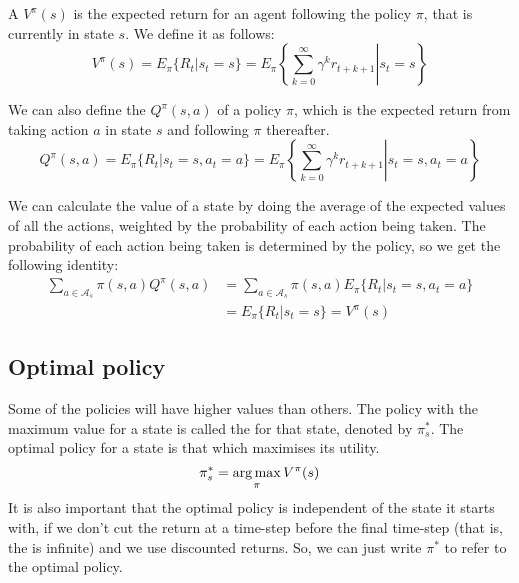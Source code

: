 A  $V^\pi(s)$ is the expected return for an agent following the
policy $\pi$, that is currently in state $s$. We define it as follows:
\begin{equation}
  V^\pi(s) = E_\pi \lbrace R_t | s_t = s \rbrace =
  E_\pi \left\{ \left. \sum_{k=0}^\infty \gamma^kr_{t+k+1} \right| s_t = s \right\}
  \label{eq:definition-value}
\end{equation}

We can also define the  $Q^\pi(s, a)$ of a policy
$\pi$, which is the expected return from taking action $a$ in state $s$ and
following $\pi$ thereafter.
\begin{equation}
  Q^\pi(s, a) = E_\pi \lbrace R_t | s_t = s, a_t = a \rbrace =
  E_\pi \left\{ \left. \sum_{k=0}^\infty \gamma^kr_{t+k+1} \right| s_t = s, a_t = a \right\}
  \label{eq:definition-qvalue}
\end{equation}

\citep[Section~3.7]{sutton1998introduction}

We can calculate the value of a state by doing the average of the
expected values of all the actions, weighted by the probability of each action
being taken. The probability of each action being taken is determined by the
policy, so we get the following identity:
\begin{equation}
  \begin{split}
  \sum_{a\in\mathcal{A}_s}\pi(s, a) Q^\pi(s, a) & = \sum_{a\in\mathcal{A}_s}\pi(s, a) E_\pi \lbrace R_t | s_t = s, a_t = a \rbrace \\
  & = E_\pi \lbrace R_t | s_t = s \rbrace = V^\pi(s)
  \end{split}
  \label{eq:equivalence-qvalue-value}
\end{equation}


\subsection{Optimal policy\label{subsec:optimal-policy}}

Some of the policies will have higher values than others. The policy with the
maximum value for a state is called the  for that state,
denoted by $\pi^*_s$. The optimal policy for a state is that which maximises its utility.
\begin{equation}
\pi^*_s = \argmax_\pi V^\pi(s)
\end{equation}
It is also important that the optimal policy is independent of the state it
starts with, if we don't cut the return at a time-step before the final
time-step (that is, the  is infinite) and we use discounted
returns. So, we can just write $\pi^*$ to refer to the optimal policy.

